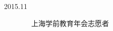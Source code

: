 \begin{tcolorbox}[colback=yellow!58!white,colframe=yellow!75!black]
    \begin{description}
        \item [2015.11] ~~上海学前教育年会志愿者
    \end{description}
\end{tcolorbox}